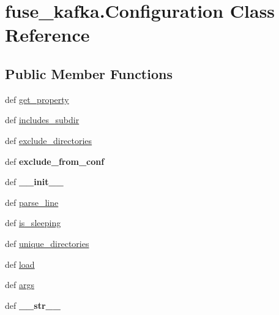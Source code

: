 \hypertarget{classfuse__kafka_1_1Configuration}{\section{fuse\-\_\-kafka.\-Configuration \-Class \-Reference}
\label{classfuse__kafka_1_1Configuration}
}
\subsection*{\-Public \-Member \-Functions}
\begin{DoxyCompactItemize}
\item 
def \hyperlink{classfuse__kafka_1_1Configuration_a962851606094dd5bc45ac8baa8fa0a16}{get\-\_\-property}
\item 
def \hyperlink{classfuse__kafka_1_1Configuration_aef5d3dda651dae8b01022f68900c2108}{includes\-\_\-subdir}
\item 
def \hyperlink{classfuse__kafka_1_1Configuration_ab13ba6dffdd3044c2200349628cd9c2b}{exclude\-\_\-directories}
\item 
\hypertarget{classfuse__kafka_1_1Configuration_a7447527ecf9030976a53158af1364027}{def {\bfseries exclude\-\_\-from\-\_\-conf}}\label{classfuse__kafka_1_1Configuration_a7447527ecf9030976a53158af1364027}

\item 
\hypertarget{classfuse__kafka_1_1Configuration_ae3a1347719fa46a9431a8fb5164f3264}{def {\bfseries \-\_\-\-\_\-init\-\_\-\-\_\-}}\label{classfuse__kafka_1_1Configuration_ae3a1347719fa46a9431a8fb5164f3264}

\item 
def \hyperlink{classfuse__kafka_1_1Configuration_ab639bd7661a61dcc6faaba06966fa9ac}{parse\-\_\-line}
\item 
def \hyperlink{classfuse__kafka_1_1Configuration_a3c643a78420c5fbad7bb5dfd48718a6f}{is\-\_\-sleeping}
\item 
def \hyperlink{classfuse__kafka_1_1Configuration_aaa2d2fcc331f390291abb8937e4e2785}{unique\-\_\-directories}
\item 
def \hyperlink{classfuse__kafka_1_1Configuration_acb3eac844331a816f9190441632951e1}{load}
\item 
def \hyperlink{classfuse__kafka_1_1Configuration_a63dba364a6a42dab38610389ab744124}{args}
\item 
\hypertarget{classfuse__kafka_1_1Configuration_a25a8f281fce858283ea4fcbac914f023}{def {\bfseries \-\_\-\-\_\-str\-\_\-\-\_\-}}\label{classfuse__kafka_1_1Configuration_a25a8f281fce858283ea4fcbac914f023}

\end{DoxyCompactItemize}
